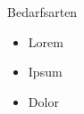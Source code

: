 \documentclass[xcolor=table,9pt,aspectratio=169]{beamer}
\begin{document}
\begin{frame}{\vspace*{10mm}Bedarfsarten}
\begin{multicols}{2}
\begin{itemize}
   \item Lorem
   \item Ipsum
   \item Dolor
\end{itemize}
\vfill

\begin{center}
   \vspace{1cm}
   \vspace{1cm}
\end{center}
\end{multicols}
\end{frame}
\end{document}
